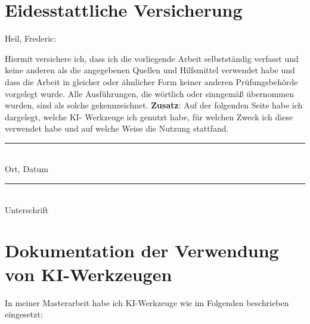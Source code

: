 \documentclass[12pt,a4paper]{article}
\begin{document}
\section*{Eidesstattliche Versicherung}
Heil, Frederic:\newline\newline

Hiermit versichere ich, dass ich die vorliegende Arbeit selbstständig verfasst und keine anderen als die
angegebenen Quellen und Hilfsmittel verwendet habe und dass die Arbeit in gleicher oder ähnlicher Form keiner
anderen Prüfungsbehörde vorgelegt wurde. Alle Ausführungen, die wörtlich oder sinngemäß übernommen wurden,
sind als solche gekennzeichnet.\newline
\textbf{Zusatz}: Auf der folgenden Seite habe ich dargelegt, welche KI-
Werkzeuge ich genutzt habe, für welchen Zweck ich diese verwendet habe und auf welche Weise die Nutzung
stattfand.
\vspace{2cm}

\noindent
\begin{minipage}[t]{0.45\textwidth}
	\rule{\textwidth}{0.4pt}\\
	Ort, Datum
\end{minipage}
\hfill
\begin{minipage}[t]{0.45\textwidth}
	\rule{\textwidth}{0.4pt}\\
	Unterschrift
\end{minipage}
\newpage

\section*{Dokumentation der Verwendung von KI-Werkzeugen}
In meiner Masterarbeit habe ich KI-Werkzeuge wie im Folgenden beschrieben eingesetzt:
\end{document}
